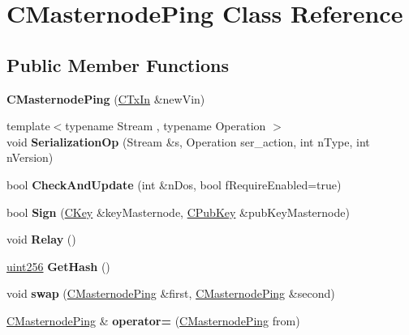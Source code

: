 \hypertarget{class_c_masternode_ping}{}\section{C\+Masternode\+Ping Class Reference}
\label{class_c_masternode_ping}
\subsection*{Public Member Functions}
\begin{DoxyCompactItemize}
\item 
\mbox{\label{class_c_masternode_ping_a5ba78e8cd006b0b519216e797e9ded3a}} 
{\bfseries C\+Masternode\+Ping} (\mbox{\hyperlink{class_c_tx_in}{C\+Tx\+In}} \&new\+Vin)
\item 
\mbox{\label{class_c_masternode_ping_a5d9d08a66b63c278d0dc18e733bdc636}} 
{\footnotesize template$<$typename Stream , typename Operation $>$ }\\void {\bfseries Serialization\+Op} (Stream \&s, Operation ser\+\_\+action, int n\+Type, int n\+Version)
\item 
\mbox{\label{class_c_masternode_ping_a24181eca6ed6d01d8260bf0ed35435eb}} 
bool {\bfseries Check\+And\+Update} (int \&n\+Dos, bool f\+Require\+Enabled=true)
\item 
\mbox{\label{class_c_masternode_ping_afa3eb82ae9457cc135089d83ae7719ea}} 
bool {\bfseries Sign} (\mbox{\hyperlink{class_c_key}{C\+Key}} \&key\+Masternode, \mbox{\hyperlink{class_c_pub_key}{C\+Pub\+Key}} \&pub\+Key\+Masternode)
\item 
\mbox{\label{class_c_masternode_ping_a52f9892350ab8e94a63e9483f9a3b21d}} 
void {\bfseries Relay} ()
\item 
\mbox{\label{class_c_masternode_ping_a3aff56c6fc3ff76363d4e527db6a812e}} 
\mbox{\hyperlink{classuint256}{uint256}} {\bfseries Get\+Hash} ()
\item 
\mbox{\label{class_c_masternode_ping_afa95b89b426ef3b83ccc5b3f30faa3bd}} 
void {\bfseries swap} (\mbox{\hyperlink{class_c_masternode_ping}{C\+Masternode\+Ping}} \&first, \mbox{\hyperlink{class_c_masternode_ping}{C\+Masternode\+Ping}} \&second)
\item 
\mbox{\label{class_c_masternode_ping_aa74630c2a9d7037bd2287d8076ad621f}} 
\mbox{\hyperlink{class_c_masternode_ping}{C\+Masternode\+Ping}} \& {\bfseries operator=} (\mbox{\hyperlink{class_c_masternode_ping}{C\+Masternode\+Ping}} from)
\end{DoxyCompactItemize}
